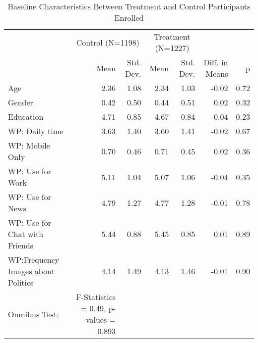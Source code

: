 \begin{table}

\caption{Baseline Characteristics Between Treatment and Control Participants Enrolled}
\centering
\begin{tabular}[t]{lrrrrrr}
\toprule
\multicolumn{1}{c}{ } & \multicolumn{2}{c}{Control (N=1198)} & \multicolumn{2}{c}{Treatment (N=1227)} & \multicolumn{2}{c}{ } \\
\cmidrule(l{3pt}r{3pt}){2-3} \cmidrule(l{3pt}r{3pt}){4-5}
  & Mean & Std. Dev. & Mean & Std. Dev. & Diff. in Means & p\\
\midrule
Age & 2.36 & 1.08 & 2.34 & 1.03 & -0.02 & 0.72\\
Gender & 0.42 & 0.50 & 0.44 & 0.51 & 0.02 & 0.32\\
Education & 4.71 & 0.85 & 4.67 & 0.84 & -0.04 & 0.23\\
WP: Daily time & 3.63 & 1.40 & 3.60 & 1.41 & -0.02 & 0.67\\
WP: Mobile Only & 0.70 & 0.46 & 0.71 & 0.45 & 0.02 & 0.36\\
WP: Use for Work & 5.11 & 1.04 & 5.07 & 1.06 & -0.04 & 0.35\\
WP: Use for News & 4.79 & 1.27 & 4.77 & 1.28 & -0.01 & 0.78\\
WP: Use for Chat with Friends & 5.44 & 0.88 & 5.45 & 0.85 & 0.01 & 0.89\\
WP:Frequency Images about Politics & 4.14 & 1.49 & 4.13 & 1.46 & -0.01 & 0.90\\
Omnibus Test: & F-Statistics = 0.49, p-values = 0.893 &  &  &  &  & \\
\bottomrule
\end{tabular}
\end{table}
